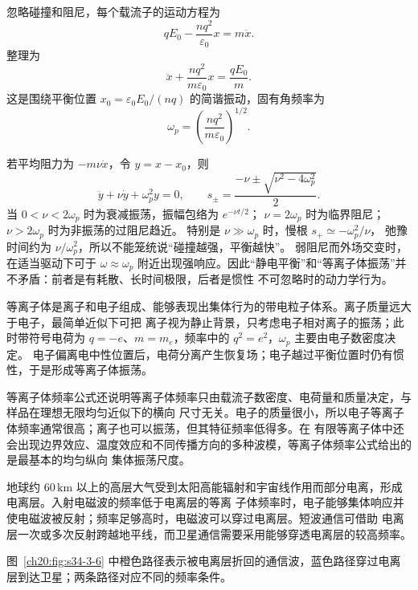 {忽略碰撞和阻尼，每个载流子的运动方程为
\[
  qE_0-\frac{nq^2}{\varepsilon_0}x=m\ddot x.
\]
整理为
\begin{equation}
  \boxed{\ddot x+\frac{nq^2}{m\varepsilon_0}x=\frac{qE_0}{m}}.
\end{equation}
这是围绕平衡位置 $x_0=\varepsilon_0E_0/(nq)$ 的简谐振动，固有角频率为
\begin{equation}
  \boxed{\omega_p=\left(\frac{nq^2}{m\varepsilon_0}\right)^{1/2}}.
\end{equation}

若平均阻力为 $-m\nu\dot x$，令 $y=x-x_0$，则
\[
 \ddot y+\nu\dot y+\omega_p^2y=0,\qquad
 s_\pm=\frac{-\nu\pm\sqrt{\nu^2-4\omega_p^2}}2.
\]
当 $0<\nu<2\omega_p$ 时为衰减振荡，振幅包络为 $e^{-\nu t/2}$；
$\nu=2\omega_p$ 时为临界阻尼；$\nu>2\omega_p$ 时为非振荡的过阻尼趋近。
特别是 $\nu\gg\omega_p$ 时，慢根 $s_+\simeq-\omega_p^2/\nu$，
弛豫时间约为 $\nu/\omega_p^2$，所以不能笼统说“碰撞越强，平衡越快”。
弱阻尼而外场交变时，在适当驱动下可于 $\omega\approx\omega_p$ 附近出现强响应。因此“静电平衡”和“等离子体振荡”并不矛盾：前者是有耗散、长时间极限，后者是惯性
不可忽略时的动力学行为。

等离子体是离子和电子组成、能够表现出集体行为的带电粒子体系。离子质量远大于电子，最简单近似下可把
离子视为静止背景，只考虑电子相对离子的振荡；此时带符号电荷为 $q=-e$、$m=m_e$，频率中的 $q^2=e^2$，$\omega_p$ 主要由电子数密度决定。
电子偏离电中性位置后，电荷分离产生恢复场；电子越过平衡位置时仍有惯性，于是形成等离子体振荡。

等离子体频率公式还说明等离子体频率只由载流子数密度、电荷量和质量决定，与样品在理想无限均匀近似下的横向
尺寸无关。电子的质量很小，所以电子等离子体频率通常很高；离子也可以振荡，但其特征频率低得多。在
有限等离子体中还会出现边界效应、温度效应和不同传播方向的多种波模，等离子体频率公式给出的是最基本的均匀纵向
集体振荡尺度。

地球约 $60\,\mathrm{km}$ 以上的高层大气受到太阳高能辐射和宇宙线作用而部分电离，形成电离层。入射电磁波的频率低于电离层的等离
子体频率时，电子能够集体响应并使电磁波被反射；频率足够高时，电磁波可以穿过电离层。短波通信可借助
电离层一次或多次反射跨越地平线，而卫星通信需要采用能够穿透电离层的较高频率。

图~\ref{ch20:fig:s34-3-6} 中橙色路径表示被电离层折回的通信波，蓝色路径穿过电离层到达卫星；两条路径对应不同的频率条件。

\par\noindent\begin{minipage}{\linewidth}
\ionosphereFigure
{}\label{ch20:fig:s34-3-6}
\end{minipage}\par\medskip

}
